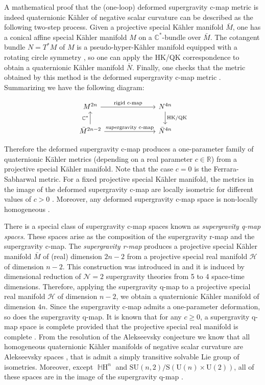 \documentclass{article}
\theoremstyle{definition}
\DeclareMathOperator{\HH}{\mathbb{H}\mathrm{H}}
\newcommand{\R}{\mathbb{R}}
\newcommand{\calH}{\mathcal{H}}
\newcommand{\SU}{\mathrm{SU}}
\begin{document}
    A mathematical proof that the (one-loop) deformed supergravity c-map metric is indeed quaternionic K\"ahler of negative scalar curvature can be described as the following two-step process. Given a projective special K\"ahler manifold $\bar M$, one has a conical affine special K\"ahler manifold $M$ on a $\mathbb{C}^*$-bundle over $\bar M$. The cotangent bundle $N=T^*M$ of $M$ is a pseudo-hyper-K\"ahler manifold \cite{CFG89,ACD02} equipped with a rotating circle symmetry \cite{ACM13}, so one can apply the HK/QK correspondence \cite{Hay08,ACM13} to obtain a quaternionic K\"ahler manifold $\bar N$. Finally, one checks that the metric obtained by this method is the deformed supergravity c-map metric \cite{ACDM15}. Summarizing we have the following diagram:

    $$\begin{tikzcd}
M^{2n} \arrow[rrr, "\text{rigid c-map}"]                                          &  &  & N^{4n} \arrow[d, "\text{HK/QK}"] \\
\bar{M}^{2n-2} \arrow[rrr, "\text{supergravity c-map}"] \arrow[u, "\mathbb{C}^*"] &  &  & \bar{N}^{4n}
    \end{tikzcd}$$

    Therefore the deformed supergravity c-map produces a one-parameter family of quaternionic K\"ahler metrics (depending on a real parameter $c\in\R$) from a projective special K\"ahler manifold. Note that the case $c=0$ is the Ferrara-Sabharwal metric. For a fixed projective special K\"ahler manifold, the metrics in the image of the deformed supergravity c-map are locally isometric for different values of $c>0$ \cite{CDS17}. Moreover, any deformed supergravity c-map space is non-locally homogeneous \cite{CGS23}.\medskip
    
    There is a special class of supergravity c-map spaces known as \emph{supergravity q-map spaces}. These spaces arise as the composition of the supergravity r-map and the supergravity c-map. The \emph{supergravity r-map} produces a projective special K\"ahler manifold $\bar{M}$ of (real) dimension $2n-2$ from a projective special real manifold $\calH$ of dimension $n-2$. This construction was introduced in \cite{dWVP92} and it is induced by dimensional reduction of $\mathcal{N}=2$ supergravity theories from 5 to 4 space-time dimensions. Therefore, applying the supergravity q-map to a projective special real manifold $\calH$ of dimension $n-2$, we obtain a quaternionic K\"ahler manifold of dimension $4n$. Since the supergravity c-map admits a one-parameter deformation, so does the supergravity q-map. It is known that for any $c\geq0$, a supergravity q-map space is complete provided that the projective special real manifold is complete \cite{CDS17}. From the resolution of the Alekseevsky conjecture \cite{BL23} we know that all homogeneous quaternionic K\"ahler manifolds of negative scalar curvature are Alekseevsky spaces \cite{Ale75,Cor96}, that is admit a simply transitive solvable Lie group of isometries. Moreover, except $\HH^n$ and $\SU(n,2)/\mathrm{S}(\mathrm{U}(n)\times\mathrm{U}(2))$, all of these spaces are in the image of the supergravity q-map \cite{dWVP92}.\medskip
    
\end{document}
